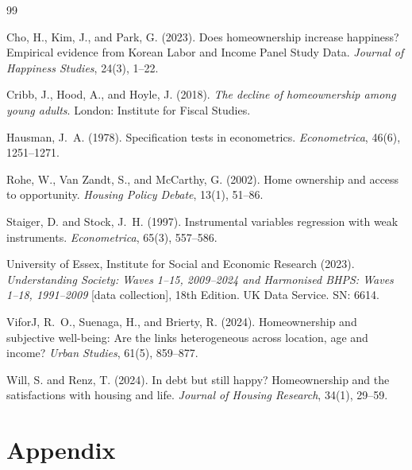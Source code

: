 \documentclass[12pt,a4paper]{article}
\begin{document}
\newpage

\begin{thebibliography}{99}
 
Cho, H., Kim, J., and Park, G. (2023).
Does homeownership increase happiness? Empirical evidence from Korean
Labor and Income Panel Study Data.
\textit{Journal of Happiness Studies}, 24(3), 1--22.
 
Cribb, J., Hood, A., and Hoyle, J. (2018).
\textit{The decline of homeownership among young adults}.
London: Institute for Fiscal Studies.
 
Hausman, J.~A. (1978).
Specification tests in econometrics.
\textit{Econometrica}, 46(6), 1251--1271.
 
Rohe, W., Van Zandt, S., and McCarthy, G. (2002).
Home ownership and access to opportunity.
\textit{Housing Policy Debate}, 13(1), 51--86.
 
Staiger, D. and Stock, J.~H. (1997).
Instrumental variables regression with weak instruments.
\textit{Econometrica}, 65(3), 557--586.
 
University of Essex, Institute for Social and Economic Research (2023).
\textit{Understanding Society: Waves 1--15, 2009--2024 and Harmonised
BHPS: Waves 1--18, 1991--2009} [data collection], 18th Edition.
UK Data Service. SN: 6614.
 
ViforJ, R.~O., Suenaga, H., and Brierty, R. (2024).
Homeownership and subjective well-being: Are the links heterogeneous
across location, age and income?
\textit{Urban Studies}, 61(5), 859--877.
 
Will, S. and Renz, T. (2024).
In debt but still happy? Homeownership and the satisfactions with
housing and life.
\textit{Journal of Housing Research}, 34(1), 29--59.
 
\end{thebibliography}
 
\newpage
\appendix
\section*{Appendix}
\end{document}
